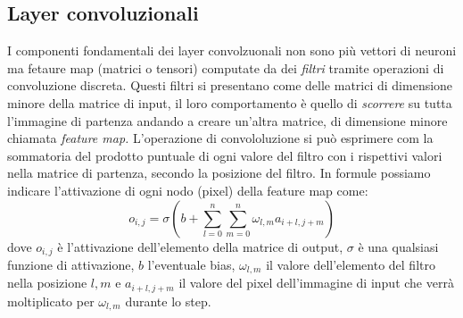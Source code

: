 \documentclass[12pt,a4paper,openright,twoside]{report}
\begin{document}
\subsection{Layer convoluzionali}
I componenti fondamentali dei layer convolzuonali non sono più vettori di neuroni ma fetaure map (matrici o tensori) computate da dei \emph{filtri} tramite operazioni di convoluzione discreta.
Questi filtri si presentano come delle matrici di dimensione minore della matrice di input, il loro comportamento è quello di \emph{scorrere} su tutta l'immagine di partenza andando a creare un'altra matrice, di dimensione minore chiamata \emph{feature map.}
L'operazione di convololuzione si può esprimere com la sommatoria del prodotto puntuale di ogni valore del filtro con i rispettivi valori nella matrice di partenza, secondo la posizione del filtro.
\newpage
In formule possiamo indicare l'attivazione di ogni nodo (pixel) della feature map come: 
\begin{equation}
    o_{i,j} = \sigma(b + \sum _{l=0}^{n}\sum _{m=0}^{n}\omega_{l,m}a_{i+l, j+m})
\end{equation}
dove $o_{i,j}$ è l'attivazione dell'elemento della matrice di output, $\sigma$ è una qualsiasi funzione di attivazione, $b$ l'eventuale bias, $\omega_{l,m}$ il valore dell'elemento del filtro nella posizione $l,m$ e $a_{i+l, j+m}$ il valore del pixel dell'immagine di input che verrà moltiplicato per $\omega_{l,m}$ durante lo step.
\end{document}
